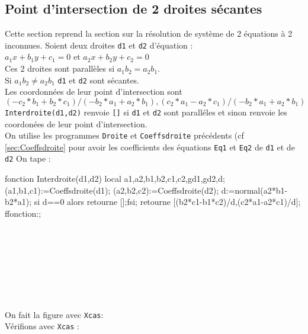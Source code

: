 \documentclass[12pt,a4paper]{book}
\begin{document}
\begin{giacjshere}
\subsection{Point d'intersection de 2 droites s\'ecantes}
Cette section reprend la section sur la r\'esolution de syst\`eme
de 2 \'equations \`a 2 inconnues.
Soient deux droites {\tt d1} et {\tt d2} d'\'equation :\\
$a_1x+b_1y+c_1=0$ et $a_2x+b_2y+c_2=0$\\
Ces 2 droites sont parall\`eles si $a_1b_2=a_2b_1$.\\
Si $a_1b_2\neq a_2b_1$ {\tt d1} et {\tt d2} sont s\'ecantes.\\
Les coordonn\'ees de leur point d'intersection sont \\
$(-c_2*b_1+b_2*c_1)/(-b_2*a_1+a_2*b_1),(c_2*a_1-a_2*c_1)/(-b_2*a_1+a_2*b_1)$
 {\tt Interdroite(d1,d2)} renvoie {\tt []} si {\tt d1} et {\tt d2} sont 
parall\'eles et sinon renvoie les coordon\'ees de leur point d'intersection.\\
On utilise les programmes {\tt Droite} et {\tt Coeffsdroite} pr\'ec\'edents 
(cf \ref{sec:Coeffsdroite} pour avoir les coefficients
des \'equations {\tt Eq1} et  {\tt Eq2} de {\tt d1} et de {\tt d2}
On tape :
\begin{giacprog}
fonction Interdroite(d1,d2)
 local a1,a2,b1,b2,c1,c2,gd1,gd2,d;
 (a1,b1,c1):=Coeffsdroite(d1);
 (a2,b2,c2):=Coeffsdroite(d2);
 d:=normal(a2*b1-b2*a1);
 si d==0 alors retourne [];fsi;
 retourne [(b2*c1-b1*c2)/d,(c2*a1-a2*c1)/d];
ffonction:;
\end{giacprog}
\\
\\
\\
\\
\\
\\
\\
On fait la figure avec {\tt Xcas}:\\
V\'erifions  avec {\tt Xcas} :\\
\\

\end{giacjshere}
\end{document}

